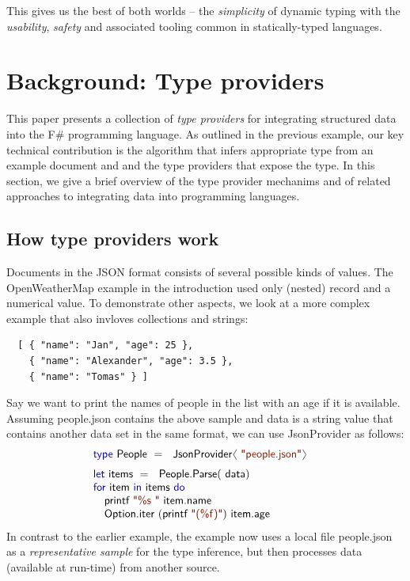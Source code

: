 \documentclass[preprint]{sigplanconf}
\newcommand{\langl}{\begin{picture}(4.5,7)
\put(1.1,2.5){\rotatebox{60}{\line(1,0){5.5}}}
\put(1.1,2.5){\rotatebox{300}{\line(1,0){5.5}}}
\end{picture}}
\newcommand{\rangl}{\begin{picture}(4.5,7)
\put(.9,2.5){\rotatebox{120}{\line(1,0){5.5}}}
\put(.9,2.5){\rotatebox{240}{\line(1,0){5.5}}}
\end{picture}}
\newcommand{\kvd}[1]{\textnormal{\textcolor{kvdclr}{\sffamily #1}}}
\newcommand{\str}[1]{\textnormal{\textcolor{strclr}{\sffamily "#1"}}}
\newcommand{\strf}[1]{\textnormal{\textcolor{strclr}{\sffamily #1}}}
\newcommand{\ident}[1]{\textnormal{\sffamily #1}}
\begin{document}
This gives us the best of both worlds -- the \emph{simplicity} of dynamic typing with the
\emph{usability}, \emph{safety} and associated tooling common in statically-typed languages.


\section{Background: Type providers}

This paper presents a collection of \emph{type providers} for integrating structured data into the
F\# programming language. As outlined in the previous example, our key technical contribution is the
algorithm that infers appropriate type from an example document and and the type providers that
expose the type. In this section, we give a brief overview of the type provider mechanims and of
related approaches to integrating data into programming languages.

\subsection{How type providers work}

Documents in the JSON format consists of several possible kinds of values. The OpenWeatherMap
example in the introduction used only (nested) record and a numerical value. To demonstrate other
aspects, we look at a more complex example that also invloves collections and strings:
%
{\small{
\begin{verbatim}
  [ { "name": "Jan", "age": 25 },
    { "name": "Alexander", "age": 3.5 },
    { "name": "Tomas" } ]
\end{verbatim}
}}
%
\noindent
Say we want to print the names of people in the list with an age if it is available. Assuming
\strf{people.json} contains the above sample and \ident{data} is a string value
that contains another data set in the same format, we can use \ident{JsonProvider} as follows:
%
\begin{equation*}
\begin{array}{l}
 \kvd{type}~\ident{People}~=~\ident{JsonProvider}\langl\str{people.json}\rangl\hspace{1em} \\ [0.6em]
 \kvd{let}~\ident{items}~=~\ident{People.Parse}(\ident{data})\\
 \kvd{for}~\ident{item}~\kvd{in}~\ident{items}~\kvd{do}\\
 \quad\ident{printf}~\str{\%s }~\ident{item.name}\\
 \quad\ident{Option.iter}~(\ident{printf}~\str{(\%f)})~\ident{item.age}
\end{array}
\end{equation*}
%
In contrast to the earlier example, the example now uses a local file \strf{people.json} as a
\emph{representative sample} for the type inference, but then processes data (available at
run-time) from another source.
\end{document}
